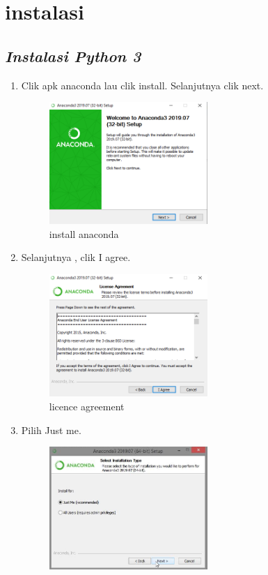 \chapter*{instalasi}


\section*{\textit{ Instalasi Python 3}}
\begin{enumerate}
		\item Clik apk anaconda lau clik install. Selanjutnya clik next.
		\begin{figure}[h]
			\includegraphics[width=6cm]{figure/1.png}
			\centering
			\caption{install anaconda}
			\end{figure}
		\item Selanjutnya , clik I agree.
			\begin{figure}[h]
			\includegraphics[width=6cm]{figure/2.png}
			\centering
			\caption{licence agreement}
			\end{figure}
		\item Pilih Just me.
			\begin{figure}[h]
			\includegraphics[width=6cm]{figure/3.png}

\end{figure}
\end{enumerate}
